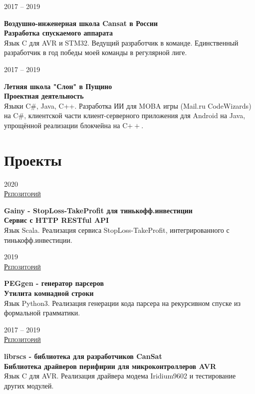 \documentclass{article}
\newcommand{\entry}[3]{
    \begin{minipage}[t]{.11\linewidth}
        \hfill \textsc{#1}
    \end{minipage}
    \hfill\vline\hfill
    \begin{minipage}[t]{.80\linewidth}
        \textbf{#2} \\
        \footnotesize{#3}
    \end{minipage}
}
\begin{document}
        \vspace{.1cm}  
    
        \entry {2017 -- 2019 \\
        }
        {Воздушно-инженерная школа Cansat в России\\
        Разработка спускаемого аппарата}
        { Язык C для AVR и STM32. Ведущий разработчик в команде. Единственный разработчик в год победы моей команды в регулярной лиге. } 
        
        \vspace{.1cm}
        
        \entry {2017 -- 2019 \\
        }
        {Летняя школа "Слон" в Пущино\\
        Проектная деятельность}
        { Языки C$\boldsymbol{\#}$, Java, C++. Разработка ИИ для MOBA игры (Mail.ru CodeWizards) на C$\boldsymbol{\#}$, клиентской части клиент-серверного приложения для Android на Java, упрощённой реализации блокчейна на C$\boldsymbol{++}$. }
        
    \section{Проекты}
        
    \entry {2020 \\
    \href {https://gitlab.com/Inversion/gainy} {Репозиторий} }
    {Gainy - StopLoss-TakeProfit для тинькофф.инвестиции \\
    Сервис с HTTP RESTful API}
    { Язык Scala. Реализация сервиса StopLoss-TakeProfit, интегрированного с тинькофф.инвестиции. } 
    
    \vspace{.1cm}
        
    \entry {2019 \\
    \href {https://github.com/InversionSpaces/PEGgen} {Репозиторий} }
    {PEGgen - генератор парсеров \\
    Утилита комнадной строки}
    { Язык Python3. Реализация генерации кода парсера на рекурсивном спуске из формальной грамматики.} 
    
    \vspace{.1cm}
    
    \entry {2017 -- 2019 \\
    \href {https://github.com/cansat-rsce/librscs} {Репозиторий} }
    {librscs - библиотека для разработчиков CanSat \\
    Библиотека драйверов перифирии для микроконтроллеров AVR}
    { Язык C для AVR. Реализация драйвера модема Iridium9602 и тестирование других модулей. } 
\end{document}
